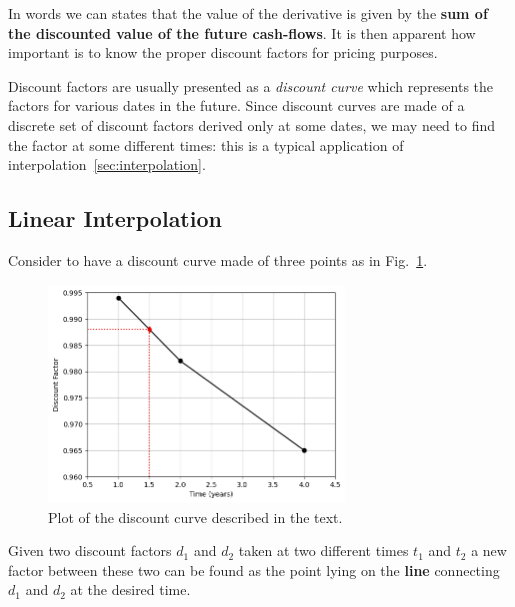 In words we can states that the value of the derivative is given by the \textbf{sum of the discounted value of the future cash-flows}.
It is then apparent how important is to know the proper discount factors for pricing purposes.

Discount factors are usually presented as a \emph{discount curve} which represents the factors for various dates in the future. 
Since discount curves are made of a discrete set of discount factors derived only at some dates, we may need to find the factor at some different times: 
this is a typical application of interpolation~\ref{sec:interpolation}.

\subsection{Linear Interpolation}
\label{linear-interpolation}

Consider to have a discount curve made of three points as in Fig.~\ref{fig:samples_for_interpolation}.

\begin{figure}[htbp]
  \centering
  \includegraphics[width=0.7\textwidth]{figures/interp_example1}
  \caption{Plot of the discount curve described in the text.}
  \label{fig:samples_for_interpolation}
\end{figure}

Given two discount factors $d_1$ and $d_2$ taken at two different times $t_1$ and $t_2$ a new factor between these two can be found as the point lying on the \textbf{line} connecting $d_1$ and $d_2$ at the desired time. 

